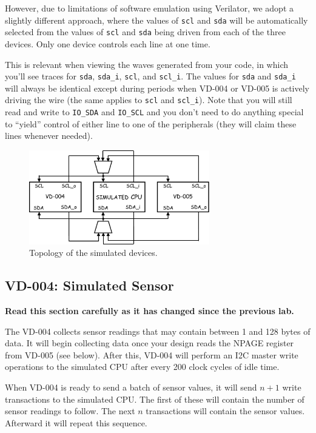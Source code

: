 \documentclass{article}
\begin{document}
However, due to limitations of software emulation using Verilator, we
adopt a slightly different approach, where the values of \texttt{scl} and
\texttt{sda} will be automatically selected from the values of \texttt{scl}
and \texttt{sda} being driven from each of the three devices.  Only one device controls each line at one time.

This is relevant when viewing the waves generated from
your code, in which you'll see traces for \texttt{sda}, \texttt{sda\_i},
\texttt{scl}, and \texttt{scl\_i}.  The values for \texttt{sda} and
\texttt{sda\_i} will always be identical except during periods when VD-004
or VD-005 is actively driving the wire (the same applies to \texttt{scl} and
\texttt{scl\_i}).  Note that you will still read and write to \texttt{IO\_SDA}
and \texttt{IO\_SCL} and you don't need to do anything special to ``yield''
control of either line to one of the peripherals (they will claim these lines
whenever needed).

\begin{figure}[H]
	\centering
	\includegraphics[max width = 0.7\textwidth]{i2c_uni.pdf}
	\caption{Topology of the simulated devices.}
\end{figure}

\subsection{VD-004: Simulated Sensor}

\textbf{Read this section carefully as it has changed since the previous lab.}

The VD-004 collects sensor readings that may contain between 1 and 128 bytes of
data.  It will begin collecting data once your design reads the NPAGE register from
VD-005 (see below).  After this, VD-004 will perform an I2C master write operations
to the simulated CPU after every 200 clock cycles of idle time.

When VD-004 is ready to send a batch of sensor values, it will send $n+1$ write
transactions to the simulated CPU.  The first of these will contain the number
of sensor readings to follow.  The next $n$ transactions will contain the sensor
values.  Afterward it will repeat this sequence.
\end{document}
